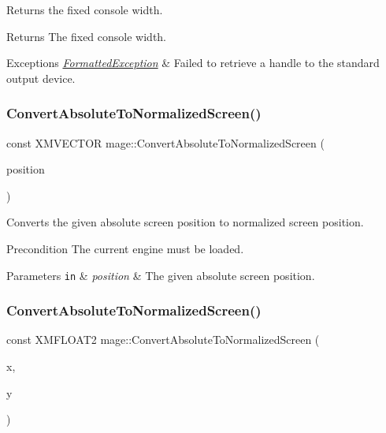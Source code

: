 Returns the fixed console width.

\begin{DoxyReturn}{Returns}
The fixed console width. 
\end{DoxyReturn}

\begin{DoxyExceptions}{Exceptions}
{\em \hyperlink{structmage_1_1_formatted_exception}{Formatted\+Exception}} & Failed to retrieve a handle to the standard output device. \\
\hline
\end{DoxyExceptions}
\hypertarget{namespacemage_add9fc09b8a7166c5e0d0bde63d8f2747}{}\label{namespacemage_add9fc09b8a7166c5e0d0bde63d8f2747} 
\subsubsection{\texorpdfstring{Convert\+Absolute\+To\+Normalized\+Screen()}{ConvertAbsoluteToNormalizedScreen()}\hspace{0.1cm}{\footnotesize\ttfamily [1/3]}}
{\footnotesize\ttfamily const X\+M\+V\+E\+C\+T\+OR mage\+::\+Convert\+Absolute\+To\+Normalized\+Screen (\begin{DoxyParamCaption}\item[{const X\+M\+V\+E\+C\+T\+OR \&}]{position }\end{DoxyParamCaption})}

Converts the given absolute screen position to normalized screen position.

\begin{DoxyPrecond}{Precondition}
The current engine must be loaded. 
\end{DoxyPrecond}

\begin{DoxyParams}[1]{Parameters}
\mbox{\tt in}  & {\em position} & The given absolute screen position. \\
\hline
\end{DoxyParams}
\hypertarget{namespacemage_a98a82c6ca513d50f16d4ee6256fdac29}{}\label{namespacemage_a98a82c6ca513d50f16d4ee6256fdac29} 
\subsubsection{\texorpdfstring{Convert\+Absolute\+To\+Normalized\+Screen()}{ConvertAbsoluteToNormalizedScreen()}\hspace{0.1cm}{\footnotesize\ttfamily [2/3]}}
{\footnotesize\ttfamily const X\+M\+F\+L\+O\+A\+T2 mage\+::\+Convert\+Absolute\+To\+Normalized\+Screen (\begin{DoxyParamCaption}\item[{float}]{x,  }\item[{float}]{y }\end{DoxyParamCaption})}

